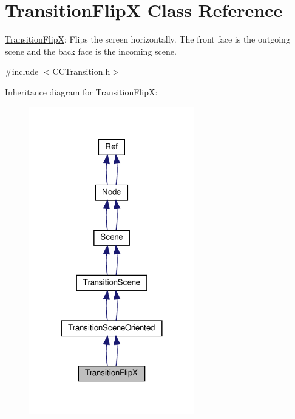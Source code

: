 \hypertarget{classTransitionFlipX}{}\section{Transition\+FlipX Class Reference}
\label{classTransitionFlipX}


\hyperlink{classTransitionFlipX}{Transition\+FlipX}\+: Flips the screen horizontally. The front face is the outgoing scene and the back face is the incoming scene.  




{\ttfamily \#include $<$C\+C\+Transition.\+h$>$}



Inheritance diagram for Transition\+FlipX\+:
\nopagebreak
\begin{figure}[H]
\begin{center}
\leavevmode
\includegraphics[width=204pt]{classTransitionFlipX__inherit__graph}
\end{center}
\end{figure}


